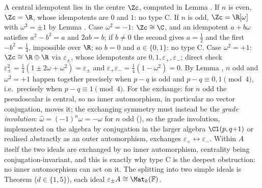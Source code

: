 A central idempotent lies in the centre $\Zc$, computed in Lemma . If $n$ is even, $\Zc = \R$, whose idempotents are $0$ and $1$: no type C. If $n$ is odd, $\Zc = \R[\omega]$ with $\omega^2 = \pm 1$ by Lemma . Case $\omega^2 = -1$: $\Zc \cong \C$, and an idempotent $a + b\omega$ satisfies $a^2 - b^2 = a$ and $2ab = b$; if $b \neq 0$ the second gives $a = \tfrac12$ and the first $-b^2 = \tfrac14$, impossible over $\R$; so $b = 0$ and $a \in \{0,1\}$: no type C. Case $\omega^2 = +1$: $\Zc \cong \R \oplus \R$ via $\varepsilon_\pm$, whose idempotents are $0, 1, \varepsilon_+, \varepsilon_-$; direct check $\varepsilon_\pm^2 = \tfrac14(1 \pm 2\omega + \omega^2) = \varepsilon_\pm$ and $\varepsilon_+\varepsilon_- = \tfrac14(1 - \omega^2) = 0$. By Lemma , $n$ odd and $\omega^2 = +1$ happen together precisely when $p - q$ is odd and $p - q \equiv 0, 1 \pmod 4$, i.e.\ precisely when $p - q \equiv 1 \pmod 4$. For the exchange: for $n$ odd the pseudoscalar is central, so no inner automorphism, in particular no vector conjugation, moves it; the exchanging symmetry must instead be the \emph{grade involution}: $\hat{\omega} = (-1)^n \omega = -\omega$ for $n$ odd (), so the grade involution, implemented on the algebra by conjugation in the larger algebra $\Cl(p,q{+}1)$ or realised abstractly as an outer automorphism, exchanges $\varepsilon_+ \leftrightarrow \varepsilon_-$. Within $A$ itself the two ideals are exchanged by no inner automorphism, centrality being conjugation-invariant, and this is exactly why type C is the deepest obstruction: no inner automorphism can act on it. The splitting into two simple ideals is Theorem  ($d \in \{1,5\}$), each ideal $\varepsilon_\pm A \cong \Mat_k(\mathbb{F})$.
